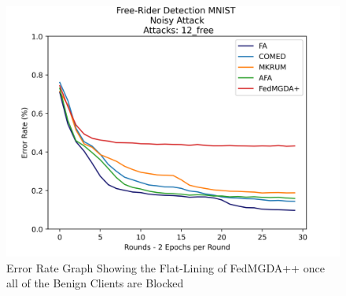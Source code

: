 \begin{figure}[htbp]
	\centering
    \includegraphics[scale=0.5]{free_riders/graphs/flat_line.png}
	\caption{Error Rate Graph Showing the Flat-Lining of FedMGDA++ once all of the Benign Clients are Blocked}
	\label{fig:flat_line}
\end{figure}